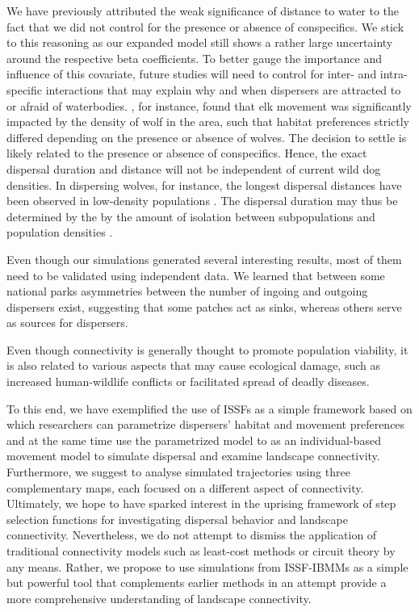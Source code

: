 \documentclass[abstract=on,10pt,a4paper,bibliography=totocnumbered]{article}
\begin{document}
We have previously attributed the weak significance of distance to water to the
fact that we did not control for the presence or absence of conspecifics. We
stick to this reasoning as our expanded model still shows a rather large
uncertainty around the respective beta coefficients. To better gauge the
importance and influence of this covariate, future studies will need to control
for inter- and intra-specific interactions that may explain why and when
dispersers are attracted to or afraid of waterbodies. \cite{Fortin.2005}, for
instance, found that elk movement was significantly impacted by the density of
wolf in the area, such that habitat preferences strictly differed depending on
the presence or absence of wolves. The decision to settle is likely related to
the presence or absence of conspecifics. Hence, the exact dispersal duration and
distance will not be independent of current wild dog densities. In dispersing
wolves, for instance, the longest dispersal distances have been observed in
low-density populations \citep{Boyd.2005, Wabakken.2007}. The dispersal duration
may thus be determined by the by the amount of isolation between subpopulations
and population densities \citep{DaviesMostert.2012}.

Even though our simulations generated several interesting results, most of them
need to be validated using independent data. We learned that between some
national parks asymmetries between the number of ingoing and outgoing dispersers
exist, suggesting that some patches act as sinks, whereas others serve as
sources for dispersers.

Even though connectivity is generally thought to promote population viability,
it is also related to various aspects that may cause ecological damage, such as
increased human-wildlife conflicts or facilitated spread of deadly diseases.

To this end, we have exemplified the use of ISSFs as a simple framework based on
which researchers can parametrize dispersers' habitat and movement preferences
and at the same time use the parametrized model to as an individual-based
movement model to simulate dispersal and examine landscape connectivity.
Furthermore, we suggest to analyse simulated trajectories using three
complementary maps, each focused on a different aspect of connectivity.
Ultimately, we hope to have sparked interest in the uprising framework of step
selection functions for investigating dispersal behavior and landscape
connectivity. Nevertheless, we do not attempt to dismiss the application of
traditional connectivity models such as least-cost methods or circuit theory by
any means. Rather, we propose to use simulations from ISSF-IBMMs as a simple but
powerful tool that complements earlier methods in an attempt provide a more
comprehensive understanding of landscape connectivity.
\end{document}
